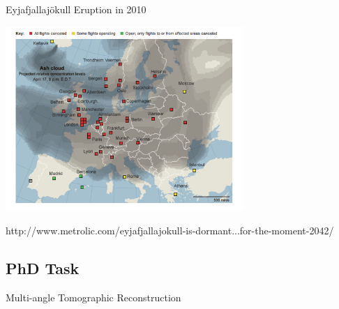 \documentclass[compress,red,12pt]{beamer}
\begin{document}
\begin{frame}{Eyjafjallaj\"{o}kull Eruption in 2010}
  \begin{center}
    \includegraphics[height=7cm]{images/volcano-airport.jpg}
  \end{center}
  \begin{flushright}
    {\tiny http://www.metrolic.com/eyjafjallajokull-is-dormant...for-the-moment-2042/}
  \end{flushright}
\end{frame}


\subsection{PhD Task}

\begin{frame}{Multi-angle Tomographic Reconstruction}
  \begin{center}
    {
      \centerline{\def\svgwidth{\linewidth}\small{}}
    }
    {
      \centerline{\def\svgwidth{\linewidth}\small{}}
    }
  \end{center}
\end{frame}

\end{document}
